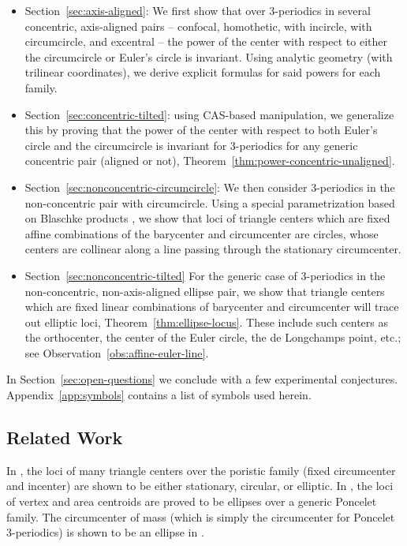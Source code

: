\begin{itemize}
  \item Section~\ref{sec:axis-aligned}: We first show that over 3-periodics in several concentric, axis-aligned pairs -- confocal, homothetic, with incircle, with circumcircle, and excentral -- the power of the center with respect to either the circumcircle or Euler's circle is invariant. Using analytic geometry (with trilinear coordinates), we derive explicit formulas for said powers for each family.
  \item Section~\ref{sec:concentric-tilted}: using CAS-based manipulation, we generalize this by proving that the power of the center with respect to both Euler's circle and the circumcircle is invariant for 3-periodics for any generic concentric pair (aligned or not), Theorem~\ref{thm:power-concentric-unaligned}.
    \item Section~\ref{sec:nonconcentric-circumcircle}: We then consider 3-periodics in the non-concentric pair with circumcircle. Using  a special parametrization based on Blaschke products \cite{daepp-2019}, we show that loci of triangle centers which are fixed affine combinations of the barycenter and circumcenter are circles, whose centers are collinear along a line passing through the stationary circumcenter.
    \item Section~\ref{sec:nonconcentric-tilted} For the generic case of 3-periodics in the non-concentric, non-axis-aligned ellipse pair, we show that triangle centers which are fixed linear combinations of barycenter and circumcenter will trace out elliptic loci, Theorem~\ref{thm:ellipse-locus}. These include such centers as the orthocenter, the center of the Euler circle, the de Longchamps point, etc.; see Observation~\ref{obs:affine-euler-line}.
\end{itemize}

In Section~\ref{sec:open-questions} we conclude with a few experimental conjectures. Appendix~\ref{app:symbols} contains a list of symbols used herein.

\subsection*{Related Work}

In \cite{odehnal2011-poristic}, the loci of many triangle centers over the poristic family (fixed circumcenter and incenter) are shown to be either stationary, circular, or elliptic. In \cite{sergei2016-com}, the loci of vertex and area centroids are proved to be ellipses over a generic Poncelet family. The circumcenter of mass (which is simply the circumcenter for Poncelet 3-periodics) is shown to be an ellipse in \cite{sergei2014-circumcenter-of-mass}.
 

